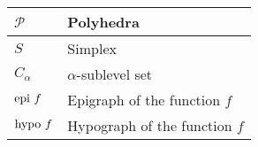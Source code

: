 \documentclass{article}
\begin{document}
\begin{xltabular}{\textwidth}{XX}
	\(\mathcal{P}\)                                                                                                          & Polyhedra                                                                                                                                                                                                      \\ \hline
	\(S\)                                                                                                                    & Simplex                                                                                                                                                                                                        \\ \hline
	\(C_\alpha\)                                                                                                             & \(\alpha\)-sublevel set                                                                                                                                                                                        \\ \hline
	\(\textnormal{epi } f\)                                                                                                  & Epigraph of the function \(f\)                                                                                                                                                                                 \\ \hline
	\(\textnormal{hypo } f\)                                                                                                 & Hypograph of the function \(f\)
\end{xltabular}
\end{document}
